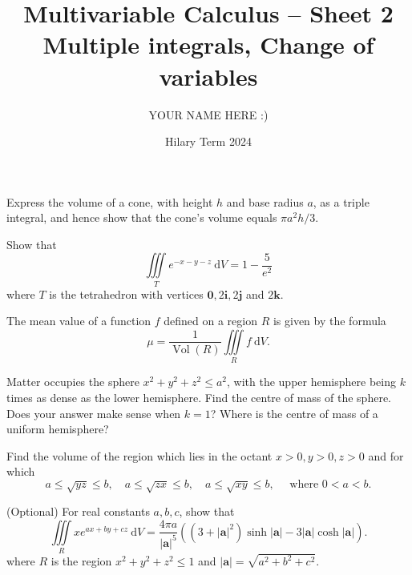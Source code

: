\documentclass[answers]{exam}
\title{Multivariable Calculus -- Sheet 2\\Multiple integrals, Change of variables}
\author{YOUR NAME HERE :)}
\date{Hilary Term 2024}
\begin{document}
\maketitle
\begin{questions}

\question%
Express the volume of a cone, with height $h$ and base radius $a$, as a triple integral, and hence show that the cone's volume equals $\pi a^{2} h / 3$.



\question%
Show that \[
	\iiint\limits_{T} e^{-x-y-z} \mathrm{~d} V=1-\frac{5}{e^{2}}
\] where $T$ is the tetrahedron with vertices $\mathbf{0}, 2 \mathbf{i}, 2 \mathbf{j}$ and $2 \mathbf{k}$.



\question%
The mean value of a function $f$ defined on a region $R$ is given by the formula \[
	\mu=\frac{1}{\operatorname{Vol}(R)} \iiint\limits_{R} f \mathrm{~d} V.
\]



\question%
Matter occupies the sphere $x^{2}+y^{2}+z^{2} \leqslant a^{2}$, with the upper hemisphere being $k$ times as dense as the lower hemisphere. Find the centre of mass of the sphere. Does your answer make sense when $k=1$? Where is the centre of mass of a uniform hemisphere?



\question%
Find the volume of the region which lies in the octant $x>0, y>0, z>0$ and for which \[
	a \leqslant \sqrt{y z} \leqslant b, \quad a \leqslant \sqrt{z x} \leqslant b, \quad a \leqslant \sqrt{x y} \leqslant b, \quad \text { where } 0<a<b .
\]



\question%
(Optional) For real constants $a, b, c$, show that \[
	\iiint\limits_{R} x e^{a x+b y+c z} \mathrm{~d} V=\frac{4 \pi a}{|\mathbf{a}|^{5}}\left((3+|\mathbf{a}|^{2}) \sinh |\mathbf{a}|-3|\mathbf{a}| \cosh |\mathbf{a}|\right).
\] where $R$ is the region $x^{2}+y^{2}+z^{2} \leqslant 1$ and $|\mathbf{a}|=\sqrt{a^{2}+b^{2}+c^{2}}$.

\end{questions}
\end{document}
